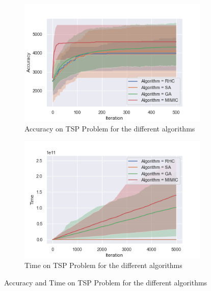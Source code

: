 \documentclass[twocolumn, 10pt]{article}
\begin{document}
				\begin{figure}[h]
					\centering
					\begin{subfigure}[t]{0.45\columnwidth}
						\centering
						\includegraphics[width=\linewidth]{../graphics/tsp_all_Iteration_Error_Algorithm.png}
						\caption{Accuracy on TSP Problem for the different algorithms}
						\label{tsp:all_accuracy}
					\end{subfigure}
					\begin{subfigure}[t]{0.45\columnwidth}
						\centering
						\includegraphics[width=\linewidth]{../graphics/tsp_all_Iteration_Time_Algorithm.png}
						\caption{Time on TSP Problem for the different algorithms}
						\label{tsp:all_time}
					\end{subfigure}
					\caption{Accuracy and Time on TSP Problem for the different algorithms}
					\label{tsp:all}
				\end{figure}
\end{document}
